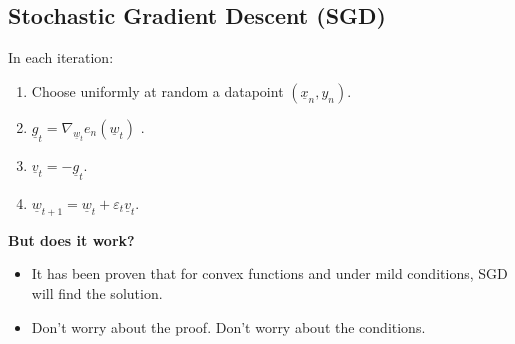 \subsection{Stochastic Gradient Descent (SGD)}
\begin{definition}
    In each iteration:
    \begin{enumerate}[left=0pt]
        \item Choose uniformly at random a datapoint \( (\underline{x}_n, y_n) \).
        \item \( \underline{g}_t = \nabla_{\underline{w}_t} e_n(\underline{w}_t) \) \quad {}.
        \item \( \underline{v}_t = -\underline{g}_t \).
        \item \( \underline{w}_{t+1} = \underline{w}_t + \varepsilon_t \underline{v}_t \).
    \end{enumerate}
\end{definition}

\begin{intuition}
    \textbf{But does it work?}
    \begin{itemize}[left=0pt]
        \item It has been proven that for convex functions and under mild conditions, SGD will find the solution.
        \item Don't worry about the proof. Don't worry about the conditions.
    \end{itemize}
\end{intuition}

